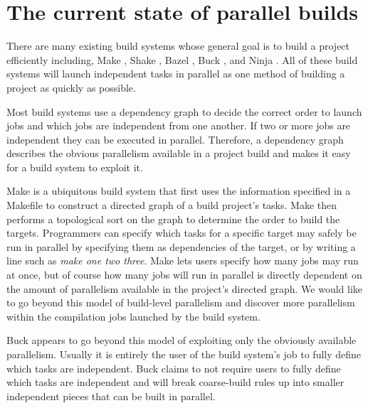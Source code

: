 \documentclass[10pt]{article}
\begin{document}
\section{The current state of parallel builds}
\label{sec:state}


There are many existing build systems whose general goal is to build a project efficiently
including, Make \cite{feldman1979make}, Shake
\cite{mitchell2012shake}, Bazel \cite{bazel}, Buck \cite{buck}, and Ninja \cite{ninja}.
All of these build systems will launch independent tasks in parallel as one method of building a
project as quickly as possible.

Most build systems use a dependency graph to decide the correct  order to launch jobs and which jobs are
independent from one another.  If two or more jobs are independent they can be executed
in parallel.  Therefore, a dependency graph describes the obvious parallelism available in a project build
and makes it easy for a build system to exploit it.

Make is a ubiquitous build system that first uses the information specified  in a
Makefile to construct a directed graph of a build project's tasks.  Make then performs a
topological sort on the graph to determine the order to build the targets.  Programmers can
specify which tasks
for a specific target may safely be run in parallel by specifying them as dependencies of the
target, or by writing a line such as \emph{make one two three}.  Make lets users specify how many
jobs may run at once, but of course how many jobs will run in parallel is directly dependent on the amount
of parallelism available in the project's directed graph.   We would like to go
beyond this model of build-level parallelism and discover more parallelism within the compilation jobs
launched by the build system.

Buck appears to go beyond this model of exploiting only the obviously available parallelism.  
Usually it is entirely the user of the build system's job to fully define which tasks are independent.
Buck claims to not require users to fully define which tasks are independent and will break coarse-build rules
up into smaller independent pieces that can be built in parallel.  

\end{document}
